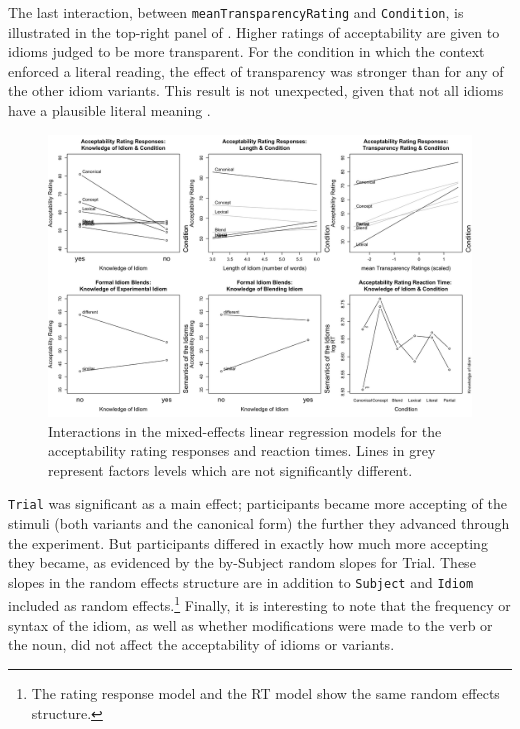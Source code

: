 \documentclass[output=paper,modfonts,nonflat]{langsci/langscibook}
\begin{document}

The last interaction, between \texttt{meanTransparencyRating} and \texttt{Condition}, is illustrated in the top-right panel of . Higher ratings of acceptability are given to idioms judged to be more transparent. For the condition in which the context enforced a literal reading, the effect of transparency was stronger than for any of the other idiom variants. This result is not unexpected, given that not all idioms have a plausible literal meaning \citep{TitoneConnine1994}. 


\begin{figure}
\centering
\includegraphics[width=\textwidth]{figures/ratings.png}
\caption{Interactions in the mixed-effects linear regression models for the acceptability rating responses and reaction times. Lines in grey represent factors levels which are not significantly different.}
\label{plotRatings}
\end{figure}

\texttt{Trial} was significant as a main effect; participants became more accepting of the stimuli (both variants and the canonical form) the further they advanced through the experiment. But participants differed in exactly how much more accepting they became, as evidenced by the by-Subject random slopes for Trial. 
These slopes in the random effects structure are in addition to \texttt{Subject} and \texttt{Idiom} included as random effects.\footnote{The rating response model and the RT model show the same random effects structure.} Finally, it is interesting to note that the frequency or syntax of the idiom, as well as whether modifications were made to the verb or the noun, did not affect the acceptability of idioms or variants. 
\end{document}
